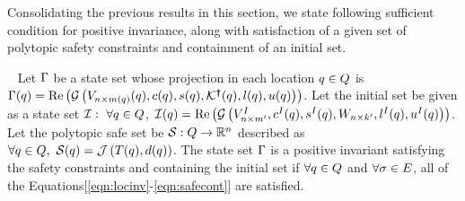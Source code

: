 Consolidating the previous results in this section, we state following
sufficient condition for positive invariance, along with satisfaction
of a given set of polytopic safety constraints and containment of an initial set.

\begin{theorem}~\label{thm:main} Let $\Gamma$ be a state set whose
  projection in each location $q\in Q$ is
  $\Gamma(q) = \operatorname{\operatorname{Re}}\left(\mathcal{G}\left(V_{n\times
      m(q)}(q),c(q),s(q),\mathcal{K}^{\bm{\dagger}}(q),l(q),u(q)\right)\right)$.
  Let the initial set be given as a state set
  $\mathcal{I}:~\forall q\in Q$,
  $\mathcal{I}(q)=\operatorname{\operatorname{Re}}\left(\mathcal{G}\left(V^I_{n\times m^\prime
  },c^I(q),s^I(q),W_{n\times
      k^\prime},l^I(q),u^I(q)\right)\right)$.  Let the polytopic safe set
  be $\mathcal{S}:Q\rightarrow\mathbb{R}^n$ described as $\forall
  q\in Q,~\mathcal{S}(q)=\mathcal{J}\left(T(q),d(q)\right)$.
  The state set $\Gamma$ is a positive invariant satisfying the
  safety constraints and containing the initial set if $\forall
  q\in Q$ and $\forall \sigma\in E$, all of the
  Equations[\ref{eqn:locinv}-\ref{eqn:safecont}] are satisfied.
\end{theorem}
